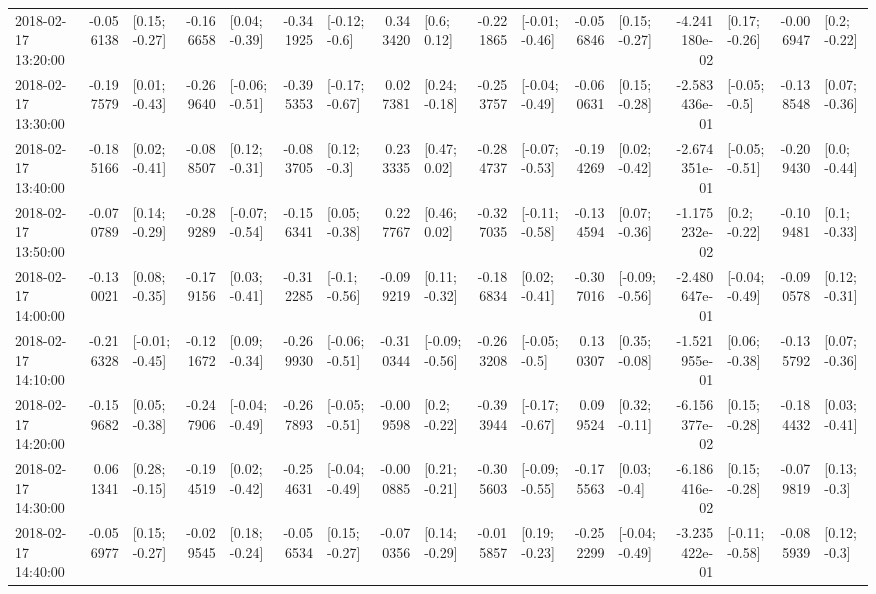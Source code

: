 \begin{tabular}{lrlrlrlrlrlrlrlrl}
2018-02-17 13:20:00 & -0.056138 &   [0.15; -0.27] & -0.166658 &   [0.04; -0.39] & -0.341925 &   [-0.12; -0.6] &  0.343420 &     [0.6; 0.12] & -0.221865 &  [-0.01; -0.46] & -0.056846 &   [0.15; -0.27] & -4.241180e-02 &   [0.17; -0.26] & -0.006947 &    [0.2; -0.22] \\
2018-02-17 13:30:00 & -0.197579 &   [0.01; -0.43] & -0.269640 &  [-0.06; -0.51] & -0.395353 &  [-0.17; -0.67] &  0.027381 &   [0.24; -0.18] & -0.253757 &  [-0.04; -0.49] & -0.060631 &   [0.15; -0.28] & -2.583436e-01 &   [-0.05; -0.5] & -0.138548 &   [0.07; -0.36] \\
2018-02-17 13:40:00 & -0.185166 &   [0.02; -0.41] & -0.088507 &   [0.12; -0.31] & -0.083705 &    [0.12; -0.3] &  0.233335 &    [0.47; 0.02] & -0.284737 &  [-0.07; -0.53] & -0.194269 &   [0.02; -0.42] & -2.674351e-01 &  [-0.05; -0.51] & -0.209430 &    [0.0; -0.44] \\
2018-02-17 13:50:00 & -0.070789 &   [0.14; -0.29] & -0.289289 &  [-0.07; -0.54] & -0.156341 &   [0.05; -0.38] &  0.227767 &    [0.46; 0.02] & -0.327035 &  [-0.11; -0.58] & -0.134594 &   [0.07; -0.36] & -1.175232e-02 &    [0.2; -0.22] & -0.109481 &    [0.1; -0.33] \\
2018-02-17 14:00:00 & -0.130021 &   [0.08; -0.35] & -0.179156 &   [0.03; -0.41] & -0.312285 &   [-0.1; -0.56] & -0.099219 &   [0.11; -0.32] & -0.186834 &   [0.02; -0.41] & -0.307016 &  [-0.09; -0.56] & -2.480647e-01 &  [-0.04; -0.49] & -0.090578 &   [0.12; -0.31] \\
2018-02-17 14:10:00 & -0.216328 &  [-0.01; -0.45] & -0.121672 &   [0.09; -0.34] & -0.269930 &  [-0.06; -0.51] & -0.310344 &  [-0.09; -0.56] & -0.263208 &   [-0.05; -0.5] &  0.130307 &   [0.35; -0.08] & -1.521955e-01 &   [0.06; -0.38] & -0.135792 &   [0.07; -0.36] \\
2018-02-17 14:20:00 & -0.159682 &   [0.05; -0.38] & -0.247906 &  [-0.04; -0.49] & -0.267893 &  [-0.05; -0.51] & -0.009598 &    [0.2; -0.22] & -0.393944 &  [-0.17; -0.67] &  0.099524 &   [0.32; -0.11] & -6.156377e-02 &   [0.15; -0.28] & -0.184432 &   [0.03; -0.41] \\
2018-02-17 14:30:00 &  0.061341 &   [0.28; -0.15] & -0.194519 &   [0.02; -0.42] & -0.254631 &  [-0.04; -0.49] & -0.000885 &   [0.21; -0.21] & -0.305603 &  [-0.09; -0.55] & -0.175563 &    [0.03; -0.4] & -6.186416e-02 &   [0.15; -0.28] & -0.079819 &    [0.13; -0.3] \\
2018-02-17 14:40:00 & -0.056977 &   [0.15; -0.27] & -0.029545 &   [0.18; -0.24] & -0.056534 &   [0.15; -0.27] & -0.070356 &   [0.14; -0.29] & -0.015857 &   [0.19; -0.23] & -0.252299 &  [-0.04; -0.49] & -3.235422e-01 &  [-0.11; -0.58] & -0.085939 &    [0.12; -0.3] \\

\end{tabular}
